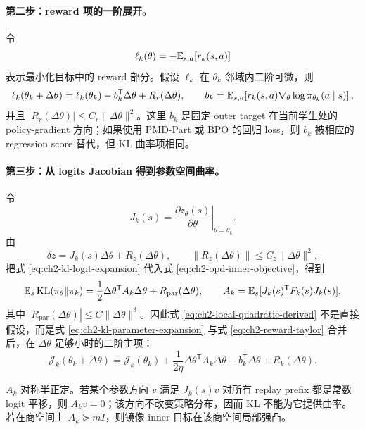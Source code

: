 \paragraph{第二步：reward 项的一阶展开。}
令
\[
\ell_k(\theta)
=
-\mathbb{E}_{s,a}[r_k(s,a)]
\]
表示最小化目标中的 reward 部分。假设 $\ell_k$ 在 $\theta_k$ 邻域内二阶可微，则
\begin{equation}
\label{eq:ch2-reward-taylor}
\ell_k(\theta_k+\Delta\theta)
=
\ell_k(\theta_k)
-b_k^{\mathsf T}\Delta\theta
+R_r(\Delta\theta),
\qquad
b_k=\mathbb{E}_{s,a}\!\left[
r_k(s,a)\nabla_\theta\log\pi_{\theta_k}(a\mid s)
\right],
\end{equation}
并且 $|R_r(\Delta\theta)|\leq C_r\|\Delta\theta\|^2$。这里 $b_k$ 是固定 outer target 在当前学生处的 policy-gradient 方向；如果使用 PMD-Part 或 BPO 的回归 loss，则 $b_k$ 被相应的 regression score 替代，但 KL 曲率项相同。

\paragraph{第三步：从 logits Jacobian 得到参数空间曲率。}
令
\[
J_k(s)=\left.\frac{\partial z_\theta(s)}{\partial\theta}\right|_{\theta=\theta_k}.
\]
由
\[
\delta z
=
J_k(s)\Delta\theta+R_z(\Delta\theta),
\qquad
\|R_z(\Delta\theta)\|\leq C_z\|\Delta\theta\|^2,
\]
把式 \eqref{eq:ch2-kl-logit-expansion} 代入式 \eqref{eq:ch2-opd-inner-objective}，得到
\begin{equation}
\label{eq:ch2-kl-parameter-expansion}
\mathbb{E}_s\operatorname{KL}(\pi_\theta\Vert\pi_k)
=
\frac12\Delta\theta^{\mathsf T}A_k\Delta\theta
+R_{\mathrm{par}}(\Delta\theta),
\qquad
A_k=\mathbb{E}_s[J_k(s)^{\mathsf T}F_k(s)J_k(s)],
\end{equation}
其中 $|R_{\mathrm{par}}(\Delta\theta)|\leq C\|\Delta\theta\|^3$。因此式 \eqref{eq:ch2-local-quadratic-derived} 不是直接假设，而是式 \eqref{eq:ch2-kl-parameter-expansion} 与式 \eqref{eq:ch2-reward-taylor} 合并后，在 $\Delta\theta$ 足够小时的二阶主项：
\begin{equation}
\label{eq:ch2-local-quadratic-derived}
\mathcal J_k(\theta_k+\Delta\theta)
=
\mathcal J_k(\theta_k)
+\frac{1}{2\eta}\Delta\theta^{\mathsf T}A_k\Delta\theta
-b_k^{\mathsf T}\Delta\theta
+R_k(\Delta\theta).
\end{equation}

\begin{proposition}[局部曲率的正半定性与不可辨识方向]
\label{prop:ch2-local-curvature}
$A_k$ 对称半正定。若某个参数方向 $v$ 满足 $J_k(s)v$ 对所有 replay prefix 都是常数 logit 平移，则 $A_kv=0$；该方向不改变策略分布，因而 KL 不能为它提供曲率。若在商空间上 $A_k\succeq mI$，则镜像 inner 目标在该商空间局部强凸。
\end{proposition}

